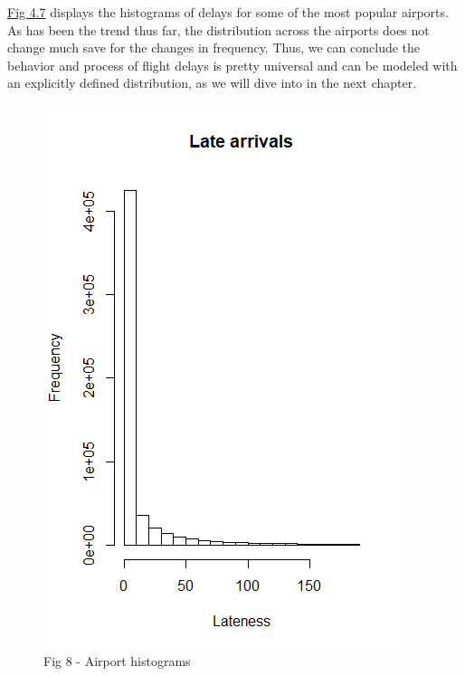\documentclass[12pt, a4paper]{book}
\newcommand\tab[1][1cm]{\hspace*{#1}}
\begin{document}
			\tab \underline{Fig 4.7} displays the histograms of delays for some of the most popular airports. As has been the trend thus far, the distribution across the airports does not change much save for the changes in frequency. Thus, we can conclude the behavior and process of flight delays is pretty universal and can be modeled with an explicitly defined distribution, as we will dive into in the next chapter. \\ 
			\begin{figure}[h]
	 		\includegraphics[width = 1 \textwidth]{../figures/LateArrivalsHistogram}
	 		\caption{Fig 8 - Airport histograms}
	 		\end{figure}
\end{document}
